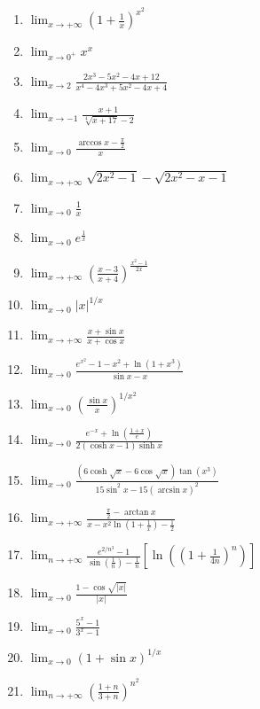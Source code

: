 \documentclass[11pt,a4paper]{article}
\begin{document}
\begin{enumerate}
\item $\displaystyle \lim_{x \to +\infty} \left(1 + \frac{1}{x}\right)^{x^{2}}$
\item $\displaystyle \lim_{x \to 0^{+}} x^{x}$
\item $\displaystyle \lim_{x \to 2} \frac{2x^{3} - 5x^{2} - 4x + 12}{x^{4} - 4x^{3} + 5x^{2} - 4x + 4}$
\item $\displaystyle \lim_{x \to -1} \frac{x + 1}{\sqrt[4]{x + 17} - 2}$
\item $\displaystyle \lim_{x \to 0} \frac{\arccos x - \frac{\pi}{2}}{x}$
\item $\displaystyle \lim_{x \to +\infty} \sqrt{2x^{2} - 1} - \sqrt{2x^{2} - x - 1}$
\item $\displaystyle \lim_{x \to 0} \frac{1}{x}$
\item $\displaystyle \lim_{x \to 0} e^{\frac{1}{x}}$
\item $\displaystyle \lim_{x \to +\infty} \left(\frac{x - 3}{x + 4}\right)^{\frac{x^{2} - 1}{2x}}$
\item $\displaystyle \lim_{x \to 0} \left|x\right|^{1/x}$
\item $\displaystyle \lim_{x \to +\infty} \frac{x + \sin x}{x + \cos x}$
\item $\displaystyle \lim_{x \to 0} \frac{e^{x^{2}} - 1 - x^{2} + \ln(1 + x^{3})}{\sin x - x}$
\item $\displaystyle \lim_{x \to 0} \left(\frac{\sin x}{x}\right)^{1/x^{2}}$
\item $\displaystyle \lim_{x \to 0} \frac{e^{-x} + \ln\left(\frac{1 + x}{e}\right)}{2(\cosh x - 1)\sinh x}$
\item $\displaystyle \lim_{x \to 0} \frac{(6\cosh\sqrt{x} - 6\cos\sqrt{x})\tan(x^{3})}{15\sin^{2} x - 15(\arcsin x)^{2}}$
\item $\displaystyle \lim_{x \to +\infty} \frac{\frac{\pi}{2} - \arctan x}{x - x^{2}\ln\left(1 + \frac{1}{x}\right) - \frac{1}{2}}$
\item $\displaystyle \lim_{n \to +\infty} \frac{e^{2/n^{3}} - 1}{\sin\left(\frac{1}{n}\right) - \frac{1}{n}}\left[\ln\left(\left(1 + \frac{1}{4n}\right)^{n}\right)\right]$
\item $\displaystyle \lim_{x \to 0} \frac{1 - \cos\sqrt{\left|x\right|}}{\left|x\right|}$
\item $\displaystyle \lim_{x \to 0} \frac{5^{x} - 1}{3^{x} - 1}$
\item $\displaystyle \lim_{x \to 0} (1 + \sin x)^{1/x}$
\item $\displaystyle \lim_{n \to +\infty} \left(\frac{1 + n}{3 + n}\right)^{n^{2}}$

\end{enumerate}
\end{document}

